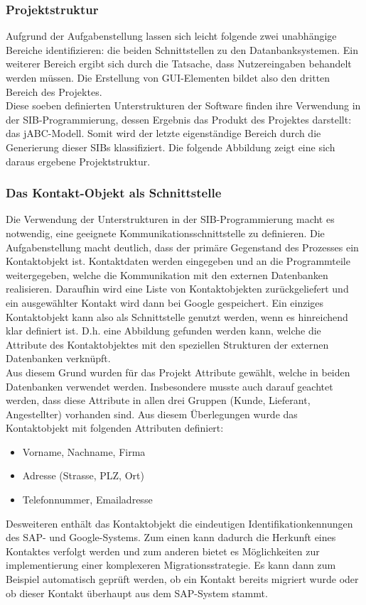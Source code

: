 \subsubsection{Projektstruktur}
Aufgrund der Aufgabenstellung lassen sich leicht folgende zwei unabhängige Bereiche identifizieren: die beiden Schnittstellen zu den Datanbanksystemen. Ein weiterer Bereich ergibt sich durch die Tatsache, dass Nutzereingaben behandelt werden müssen. Die Erstellung von GUI-Elementen bildet also den dritten Bereich des Projektes.\\
Diese soeben definierten Unterstrukturen der Software finden ihre Verwendung in der SIB-Programmierung, dessen Ergebnis das Produkt des Projektes darstellt: das jABC-Modell. Somit wird der letzte eigenständige Bereich durch die Generierung dieser SIBs klassifiziert. Die folgende Abbildung zeigt eine sich daraus ergebene Projektstruktur.\\
	
\subsubsection{Das Kontakt-Objekt als Schnittstelle}
Die Verwendung der Unterstrukturen in der SIB-Programmierung macht es notwendig, eine geeignete Kommunikationsschnittstelle zu definieren. Die Aufgabenstellung macht deutlich, dass der primäre Gegenstand des Prozesses ein Kontaktobjekt ist. Kontaktdaten werden eingegeben und an die Programmteile weitergegeben, welche die Kommunikation mit den externen Datenbanken realisieren. Daraufhin wird eine Liste von Kontaktobjekten zurückgeliefert und ein ausgewählter Kontakt wird dann bei Google gespeichert. Ein einziges Kontaktobjekt kann also als Schnittstelle genutzt werden, wenn es hinreichend klar definiert ist. D.h. eine Abbildung gefunden werden kann, welche die Attribute des Kontaktobjektes mit den speziellen Strukturen der externen Datenbanken verknüpft.\\
Aus diesem Grund wurden für das Projekt Attribute gewählt, welche in beiden Datenbanken verwendet werden. Insbesondere musste auch darauf geachtet werden, dass diese Attribute in allen drei Gruppen (Kunde, Lieferant, Angestellter) vorhanden sind. Aus diesem Überlegungen wurde das Kontaktobjekt mit folgenden Attributen definiert:
\begin{itemize}
	\item Vorname, Nachname, Firma
	\item Adresse (Strasse, PLZ, Ort)
	\item Telefonnummer, Emailadresse
\end{itemize}
Desweiteren enthält das Kontaktobjekt die eindeutigen Identifikationkennungen des SAP- und Google-Systems. Zum einen kann dadurch die Herkunft eines Kontaktes verfolgt werden und zum anderen bietet es Möglichkeiten zur implementierung einer komplexeren Migrationsstrategie. Es kann dann zum Beispiel automatisch geprüft werden, ob ein Kontakt bereits migriert wurde oder ob dieser Kontakt überhaupt aus dem SAP-System stammt.
	
